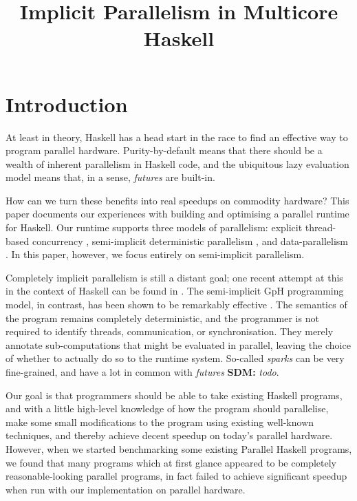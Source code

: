 \documentclass[twocolumn,9pt]{sigplanconf}
\title{Implicit Parallelism in Multicore Haskell}
\newcommand{\sdm}[1]{{{\bf SDM:} \sl #1}}
\begin{document}
\maketitle
\makeatactive

\begin{abstract}
\end{abstract}

\section{Introduction}
\label{s:intro}

At least in theory, Haskell has a head start in the race to find an
effective way to program parallel hardware.  Purity-by-default means
that there should be a wealth of inherent parallelism in Haskell code,
and the ubiquitous lazy evaluation model means that, in a sense,
\emph{futures} are built-in.

How can we turn these benefits into real speedups on commodity
hardware?  This paper documents our experiences with building and
optimising a parallel runtime for Haskell.  Our runtime supports three
models of parallelism: explicit thread-based concurrency
\cite{jones96concurrent}, semi-implicit deterministic parallelism
\cite{trinder:strategies}, and data-parallelism \cite{spj:harnessing}.
In this paper, however, we
focus entirely on semi-implicit parallelism.

Completely implicit parallelism is still a distant goal; one recent
attempt at this in the context of Haskell can be found in
\cite{fdip}.  The semi-implicit GpH programming model, in
contrast, has been shown to be remarkably effective \cite{cpe, loidl:comparing}.  The
semantics of the program remains 
completely deterministic, and the programmer is not required
to identify threads, communication, or synchronisation.  They merely
annotate sub-computations that might be evaluated in parallel, leaving
the choice of whether to actually do so to the runtime system.
So-called \emph{sparks} can be very fine-grained, and have a lot in
common with \emph{futures} \cite{} \sdm{todo}.

Our goal is that programmers should be able to take existing Haskell
programs, and with a little high-level knowledge of how the program
should parallelise, make some small modifications to the program using
existing well-known techniques, and thereby achieve decent speedup on
today's parallel hardware.  However, when we started benchmarking some
existing Parallel Haskell programs, we found that many programs which
at first glance appeared to be completely reasonable-looking parallel
programs, in fact failed to achieve significant speedup when run with
our implementation on parallel hardware.
\end{document}
